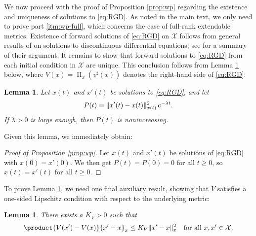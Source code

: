 \documentclass[reqno]{amsart}
\DeclarePairedDelimiter{\norm}{\lVert}{\rVert}
\theoremstyle{plain}
\newtheorem{lemma}[theorem]{Lemma}
\theoremstyle{definition}
\theoremstyle{remark}
\numberwithin{equation}{section}
\numberwithin{theorem}{section}
\begin{document}
We now proceed with the proof of Proposition \ref{prop:wp} regarding the existence and uniqueness of solutions to \eqref{eq:RGD}.
As noted in the main text, we only need to prove part \eqref{itm:wp-full}, which concerns the case of full-rank extendable metrics.
Existence of forward solutions of \eqref{eq:RGD} on ${\mathcal{X}}$ follows from general results of \cite{AC84} on solutions to discontinuous differential equations;
see \cite{LS08} for a summary of their argument.  
It remains to show that forward solutions to \eqref{eq:RGD} from each initial condition in ${\mathcal{X}}$ are unique.
This conclusion follows from Lemma \ref{lem:Gronwall} below, where ${V}(x) = \operatorname{\Pi}_{x}({v}^{\sharp}(x))$ denotes the right-hand side of \eqref{eq:RGD}:

\begin{lemma}
\label{lem:Gronwall}
Let $x(t)$ and $x'(t)$ be solutions to \eqref{eq:RGD}, and let 
\begin{equation}
\label{eq:DefP}
P(t)
	= \norm{x'(t)-x(t)}_{x(t)}^{2} \, e^{-\lambda t}.
\end{equation}
If $\lambda>0$ is large enough, then $P(t)$ is nonincreasing. 
\end{lemma}

Given this lemma, we immediately obtain:
\begin{proof}[Proof of Proposition \ref{prop:wp}]
Let $x(t)$ and $x'(t)$ be solutions of \eqref{eq:RGD} with $x(0)= x'(0)$.
We then get $P(t) = P(0) = 0$ for all $t\geq 0$, so $x(t)= x'(t)$ for all $t \geq 0$.
\end{proof}

To prove Lemma \ref{lem:Gronwall}, we need one final auxiliary result, showing that ${V}$ satisfies a one-sided Lipschitz
condition with respect to the underlying metric:

\begin{lemma}
\label{lem:1SL}
There exists a $K_{V} >0$ such that 
\begin{equation}
\label{eq:1SL}
\product{{V}(x')-{V}(x)}{x'-x}_{x}
	\leq K_{V} \norm{x'-x}_{x}^{2}
	\quad
	\text{for all $x, x' \in {\mathcal{X}}$}.
\end{equation}
\end{lemma}
\end{document}
